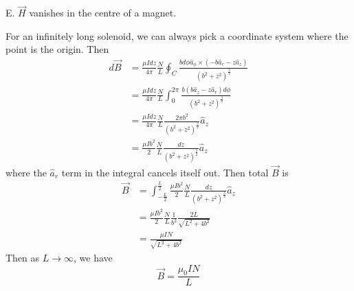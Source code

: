 \documentclass[answers]{exam}
\begin{document}
\begin{questions}
\begin{solution}
    E. $\vec H$ vanishes in the centre of a magnet.
\end{solution}


\begin{solution}
    For an infinitely long solenoid, we can always pick a coordinate system where the point is the origin. Then
    \begin{align*}
        d\vec B &= \frac{\mu Idz}{4\pi} \frac{N}{L} \oint_C \frac{bd\phi\hat a_\phi \times (-b\hat a_r-z\hat a_z)}{(b^2+z^2)^{\frac{3}{2}}} \\
                &= \frac{\mu Idz}{4\pi} \frac{N}{L} \int_0^{2\pi} \frac{b(b\hat a_z - z\hat a_r)d\phi}{(b^2+z^2)^{\frac{3}{2}}} \\
                &= \frac{\mu Idz}{4\pi} \frac{N}{L} \frac{2\pi b^2}{(b^2+z^2)^{\frac{3}{2}}} \hat a_z \\
                &= \frac{\mu Ib^2}{2} \frac{N}{L} \frac{dz}{(b^2+z^2)^{\frac{3}{2}}} \hat a_z
    \end{align*}
    where the $\hat a_r$ term in the integral cancels itself out. Then total $\vec B$ is
    \begin{align*}
        \vec B &= \int_{-\frac{L}{2}}^{\frac{L}{2}} \frac{\mu Ib^2}{2} \frac{N}{L} \frac{dz}{(b^2+z^2)^{\frac{3}{2}}} \hat a_z \\
               &= \frac{\mu Ib^2}{2} \frac{N}{L} \frac{1}{b^2} \frac{2L}{\sqrt{L^2+4b^2}} \\
               &= \frac{\mu IN}{\sqrt{L^2+4b^2}}
    \end{align*}
    Then as $L\rightarrow\infty$, we have
    $$\vec B = \frac{\mu_0 IN}{L}$$
\end{solution}



\end{questions}
\end{document}

